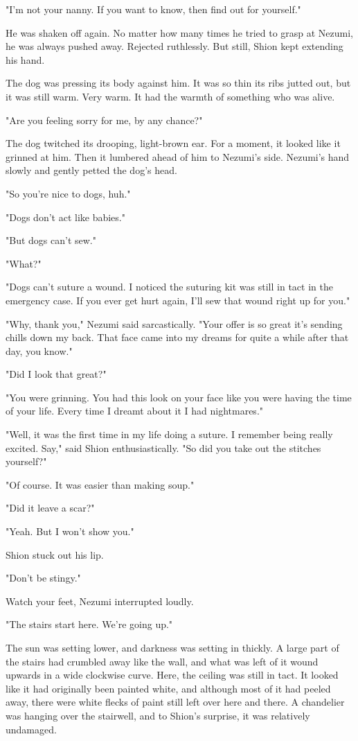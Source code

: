 "I'm not your nanny. If you want to know, then find out for yourself."

He was shaken off again. No matter how many times he tried to grasp at
Nezumi, he was always pushed away. Rejected ruthlessly. But still, Shion
kept extending his hand.

The dog was pressing its body against him. It was so thin its ribs
jutted out, but it was still warm. Very warm. It had the warmth of
something who was alive.

"Are you feeling sorry for me, by any chance?"

The dog twitched its drooping, light-brown ear. For a moment, it looked
like it grinned at him. Then it lumbered ahead of him to Nezumi's side.
Nezumi's hand slowly and gently petted the dog's head.

"So you're nice to dogs, huh."

"Dogs don't act like babies."

"But dogs can't sew."

"What?"

"Dogs can't suture a wound. I noticed the suturing kit was still in tact
in the emergency case. If you ever get hurt again, I'll sew that wound
right up for you."

"Why, thank you," Nezumi said sarcastically. "Your offer is so great
it's sending chills down my back. That face came into my dreams for
quite a while after that day, you know."

"Did I look that great?"

"You were grinning. You had this look on your face like you were having
the time of your life. Every time I dreamt about it I had nightmares."

"Well, it was the first time in my life doing a suture. I remember being
really excited. Say," said Shion enthusiastically. "So did you take out
the stitches yourself?"

"Of course. It was easier than making soup."

"Did it leave a scar?"

"Yeah. But I won't show you."

Shion stuck out his lip.

"Don't be stingy."

Watch your feet, Nezumi interrupted loudly.

"The stairs start here. We're going up."

The sun was setting lower, and darkness was setting in thickly. A large
part of the stairs had crumbled away like the wall, and what was left of
it wound upwards in a wide clockwise curve. Here, the ceiling was still
in tact. It looked like it had originally been painted white, and
although most of it had peeled away, there were white flecks of paint
still left over here and there. A chandelier was hanging over the
stairwell, and to Shion's surprise, it was relatively undamaged.

